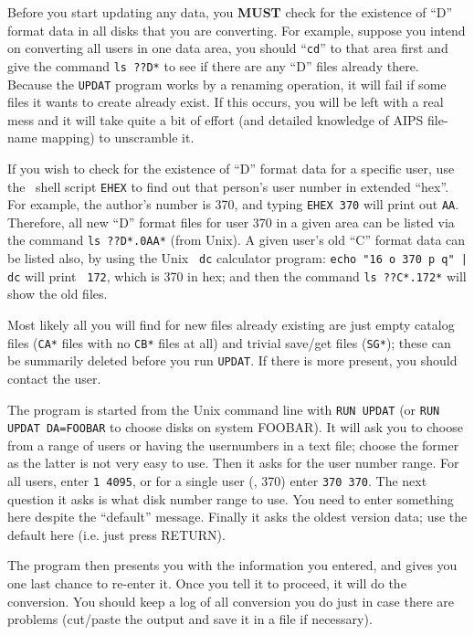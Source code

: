 Before you start updating any data, you {\bf MUST} check for the
existence of ``D'' format data in all disks that you are converting.
For example, suppose you intend on converting all users in one data
area, you should ``{\tt cd}'' to that area first and give the command
{\tt ls ??D*} to see if there are any ``D'' files already there.
Because the {\tt UPDAT} program works by a renaming operation, it will
fail if some files it wants to create already exist.  If this occurs,
you will be left with a real mess and it will take quite a bit of effort
(and detailed knowledge of AIPS file-name mapping) to unscramble it.

If you wish to check for the existence of ``D'' format data for a
specific user, use the \SYSU\ shell script {\tt EHEX} to find out that
person's user number in extended ``hex''.  For example, the author's
number is 370, and typing {\tt EHEX 370} will print out {\tt AA}.
Therefore, all new ``D'' format files for user 370 in a given area can
be listed via the command {\tt ls ??D*.0AA*} (from Unix).  A given
user's old ``C'' format data can be listed also, by using the Unix {\tt
dc} calculator program: {\tt echo "16 o 370 p q" | dc} will print {\tt
172}, which is 370 in hex; and then the command {\tt ls ??C*.172*} will
show the old files.

Most likely all you will find for new files already existing are just
empty catalog files ({\tt CA*} files with no {\tt CB*} files at all) and
trivial save/get files ({\tt SG*}); these can be summarily deleted
before you run {\tt UPDAT}.  If there is more present, you should
contact the user.

\medskip{}

The program is started from the Unix command line with {\tt RUN UPDAT}
(or {\tt RUN UPDAT DA=FOOBAR} to choose disks on system FOOBAR).  It
will ask you to choose from a range of users or having the usernumbers
in a text file; choose the former as the latter is not very easy to use.
Then it asks for the user number range.  For all users, enter {\tt 1
4095}, or for a single user (\eg, 370) enter {\tt 370 370}.  The next
question it asks is what disk number range to use.  You need to enter
something here despite the ``default'' message.  Finally it asks the
oldest version data; use the default here (i.e. just press RETURN).

The program then presents you with the information you entered, and
gives you one last chance to re-enter it.  Once you tell it to proceed,
it will do the conversion.  You should keep a log of all conversion you
do just in case there are problems (cut/paste the output and save it in
a file if necessary).

